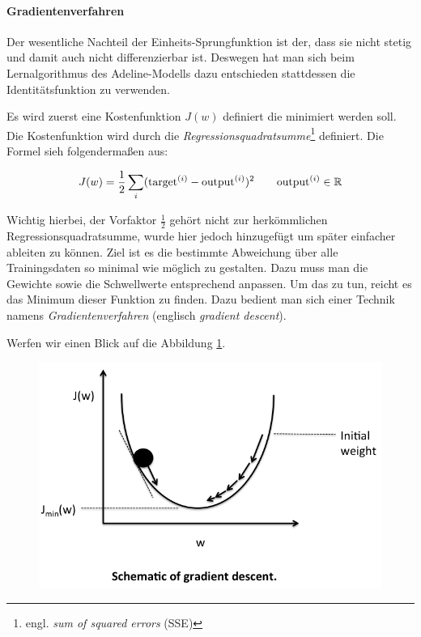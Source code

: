 \paragraph{Gradientenverfahren}
Der wesentliche Nachteil der Einheits-Sprungfunktion ist der, dass sie nicht stetig und damit auch nicht differenzierbar ist. Deswegen hat man sich beim Lernalgorithmus des Adeline-Modells dazu entschieden stattdessen die Identitätsfunktion zu verwenden. 

Es wird zuerst eine Kostenfunktion ${J(w)}$ definiert die minimiert werden soll. Die Kostenfunktion wird durch die \emph{Regressionsquadratsumme}\footnote{engl. \emph{sum of squared errors} (SSE)} definiert. Die Formel sieh folgendermaßen aus: 

\begin{equation}
J(w)  = \frac{1}{2} \sum_{i} (\text{target}^{(i)} - \text{output}^{(i)})^2 \quad \quad \text{output}^{(i)} \in \mathbb{R} \\
\end{equation}

Wichtig hierbei, der Vorfaktor ${ \frac{1}{2} }$ gehört nicht zur herkömmlichen Regressionsquadratsumme, wurde hier jedoch hinzugefügt um später einfacher ableiten zu können. Ziel ist es die bestimmte Abweichung über alle Trainingsdaten so minimal wie möglich zu gestalten. Dazu muss man die Gewichte sowie die Schwellwerte entsprechend anpassen. Um das zu tun, reicht es das Minimum dieser Funktion zu finden. Dazu bedient man sich einer Technik namens \emph{Gradientenverfahren} (englisch \emph{gradient descent}). 

Werfen wir einen Blick auf die Abbildung \ref{fig:ad_gd1}. 

\begin{figure}[!htb]
	\centering
	\includegraphics[width=.7\linewidth]{img/adeline_gd1}
	\label{fig:ad_gd1}
\end{figure}

